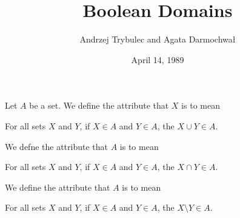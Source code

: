 \documentclass{article}
\title{Boolean Domains}
\author{Andrzej Trybulec and Agata Darmochwa\l}
\date{April 14, 1989}
\begin{document}
\maketitle

\begin{definition}
Let $A$ be a set.
We define the attribute that $X$ is  to mean
\begin{defn}
\item For all sets $X$ and $Y$, if $X\in A$ and $Y\in A$, the $X\cup Y\in A$.
\end{defn}
We defne the attribute that $A$ is  to mean
\begin{defn}
\item For all sets $X$ and $Y$, if $X\in A$ and $Y\in A$, the $X\cap Y\in A$.
\end{defn}
We define the attribute that $A$ is  to mean
\begin{defn}
\item For all sets $X$ and $Y$, if $X\in A$ and $Y\in A$, the $X\setminus Y\in A$.
\end{defn}
\end{definition}
\end{document}
